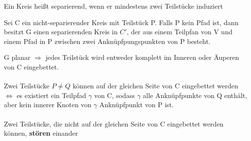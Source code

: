 \documentclass[14pt]{article}
\begin{document}
\begin{definition}
    Ein Kreis heißt separierend, wenn er mindestens zwei
    Teilstücke induziert
\end{definition}
\begin{eigenschaft}
    Sei C ein nicht-separierender Kreis mit Teilstück P.
    Falls P kein Pfad ist, dann besitzt G einen separierenden Kreis
    in $C'$, der aus einem Teilpfan von V und einem Pfad in P 
    zwischen zwei Anknüpfpungspunkten von P besteht.
\end{eigenschaft}
\begin{definition}
    G planar $\Rightarrow$ jedes Teilstück wird entweder komplett im Inneren oder
    Äuperen von C eingebettet. \\
    \\
    Zwei Teilstücke $P \neq Q$ können auf der gleichen Seite von C 
    eingebettet werden $\Leftrightarrow$ es existiert ein Teilpfad $\gamma$ von C,
    sodass $\gamma$ alle Anknüpfpunkte von Q enthält, aber kein innerer 
    Knoten von $\gamma$ Anknüpfpunkt von P ist. \\
    \\
    Zwei Teilstücke, die nicht auf der gleichen Seite von C
    eingebettet werden können, \textbf{stören} einander
\end{definition}
\end{document}
